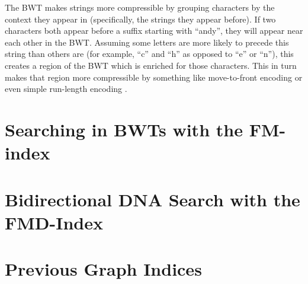 \documentclass[11pt,proposal]{ucthesis}
\begin{document}
The BWT makes strings more compressible by grouping characters by the context they appear in (specifically, the strings they appear before). If two characters both appear before a suffix starting with ``andy'', they will appear near each other in the BWT. Assuming some letters are more likely to precede this string than others are (for example, ``c'' and ``h'' as opposed to ``e'' or ``n''), this creates a region of the BWT which is enriched for those characters. This in turn makes that region more compressible by something like move-to-front encoding or even simple run-length encoding \cite{burrows1994block}.


    
    
    
    
\section{Searching in BWTs with the FM-index}

    
    




\section{Bidirectional DNA Search with the FMD-Index}


\section{Previous Graph Indices}
    
    
    
\end{document}
